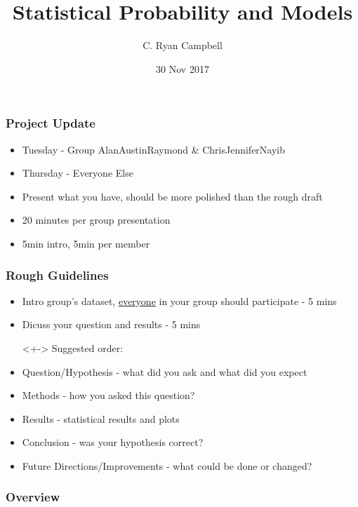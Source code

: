 \documentclass[14pt,handout]{beamer}
\title[Probability and Models]{Statistical Probability and Models} %
\author{C. Ryan Campbell} %
\institute[Duke] %
{
Duke University \\ %
\medskip
\textit{c.ryan.campbell@duke.edu} %
}
\date{30 Nov 2017} %
\begin{document}
\begin{frame}
\titlepage %
\end{frame}

\begin{frame}
\frametitle{Project Update}
\begin{itemize}
	\item<+-> Tuesday - Group AlanAustinRaymond \& ChrisJenniferNayib
	\item<+-> Thursday - Everyone Else
	\item<+-> Present what you have, should be more polished than the rough draft
	\item<+-> 20 minutes per group presentation
	\item<+-> 5min intro, 5min per member
\end{itemize}
\end{frame}

\begin{frame}
\frametitle{Rough Guidelines}
\begin{itemize}
	\item<+-> Intro group's dataset, \underline{everyone} in your group should participate - 5 mins
	\item<+-> Dicuss your question and results - 5 mins
	\item[]<+-> Suggested order:
	\item<+-> Question/Hypothesis - what did you ask and what did you expect
	\item<+-> Methods - how you asked this question?
	\item<+-> Results - statistical results and plots
	\item<+-> Conclusion - was your hypothesis correct?
	\item<+-> Future Directions/Improvements - what could be done or changed?
\end{itemize}
\end{frame}

\begin{frame}
\frametitle{Overview} %
\tableofcontents %
\end{frame}
\end{document}
